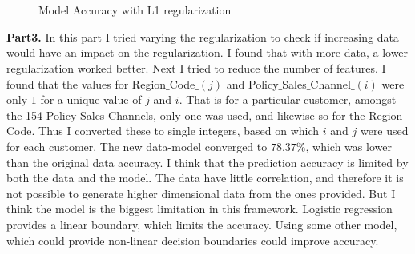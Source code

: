 \documentclass{article}
\begin{document}
\begin{figure}[h]
    \\
    \\
\caption{Model Accuracy with L1 regularization}
    \label{fig:L1_vs_lambda}%
\end{figure}

\textbf{Part3.} In this part I tried varying the regularization to check if increasing data would have an impact on the regularization. I found that with more data, a lower regularization worked better. Next I tried to reduce the number of features. I found that the values for Region$\_$Code$\_(j)$ and Policy$\_$Sales$\_$Channel$\_(i)$ were only $1$ for a unique value of $j$ and $i$. That is for a particular customer, amongst the 154 Policy Sales Channels, only one was used, and likewise so for the Region Code. Thus I converted these to single integers, based on which $i$ and $j$ were used for each customer. The new data-model converged to $78.37\%$, which was lower than the original data accuracy. I think that the prediction accuracy is limited by both the data and the model. The data have little correlation, and therefore it is not possible to generate higher dimensional data from the ones provided. But I think the model is the biggest limitation in this framework. Logistic regression provides a linear boundary, which limits the accuracy. Using some other model, which could provide non-linear decision boundaries could improve accuracy.
\end{document}
